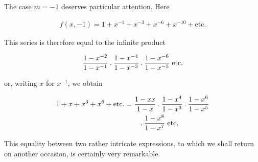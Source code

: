 The case $m=-1$ deserves particular attention. Here

\[
\begin{aligned}
f(x,-1)=1+x^{-1}+x^{-3}+x^{-6}+x^{-10}+\text{etc.}
\end{aligned}
\]

This series is therefore equal to the infinite product

\[
\begin{aligned}
\frac{1-x^{-2}}{1-x^{-1}}\mathbin{.}\frac{1-x^{-4}}{1-x^{-3}}\mathbin{.}\frac{1-x^{-6}}{1-x^{-5}}\;\text{etc.}
\end{aligned}
\]

or, writing $x$ for $x^{-1}$, we obtain

\[
\begin{aligned}
1+x+x^3+x^6+\text{etc.}&=\frac{1-xx}{1-x}\mathbin{.}\frac{1-x^4}{1-x^3}\mathbin{.}\frac{1-x^6}{1-x^5}\\
&\qquad\mathbin{.}\frac{1-x^8}{1-x^7}\;\text{etc.}
\end{aligned}
\]

This equality between two rather intricate expressions, to which we shall return on another occasion, is certainly very remarkable.
